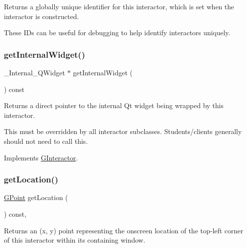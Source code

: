 Returns a globally unique identifier for this interactor, which is set when the interactor is constructed. 

These I\+Ds can be useful for debugging to help identify interactors uniquely. \mbox{\label{classGBrowserPane_a208ce13c1da40bf0ddb509daf99d6588}} 
\subsubsection{\texorpdfstring{get\+Internal\+Widget()}{getInternalWidget()}}
{\footnotesize\ttfamily \+\_\+\+Internal\+\_\+\+Q\+Widget $\ast$ get\+Internal\+Widget (\begin{DoxyParamCaption}{ }\end{DoxyParamCaption}) const\hspace{0.3cm}{\ttfamily [virtual]}}



Returns a direct pointer to the internal Qt widget being wrapped by this interactor. 

This must be overridden by all interactor subclasses. Students/clients generally should not need to call this. 

Implements \mbox{\hyperlink{classGInteractor}{G\+Interactor}}.

\mbox{\label{classGInteractor_a4f83802015511edeb63b892830812c11}} 
\subsubsection{\texorpdfstring{get\+Location()}{getLocation()}}
{\footnotesize\ttfamily \mbox{\hyperlink{classGPoint}{G\+Point}} get\+Location (\begin{DoxyParamCaption}{ }\end{DoxyParamCaption}) const\hspace{0.3cm}{\ttfamily [virtual]}, {\ttfamily [inherited]}}



Returns an (x, y) point representing the onscreen location of the top-\/left corner of this interactor within its containing window. 


